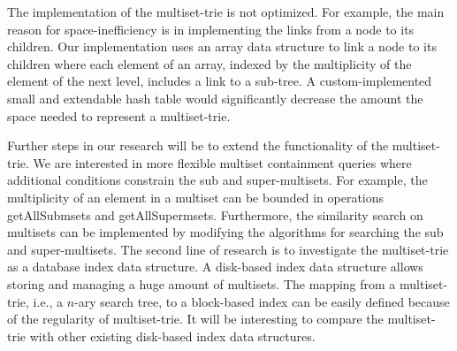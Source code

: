 The implementation of the multiset-trie is not optimized. For example, the main reason for space-inefficiency is in implementing the links from a node to its children. Our implementation uses an array data structure to link a node to its children where each element of an array, indexed by the multiplicity of the element of the next level, includes a link to a sub-tree. A custom-implemented small and extendable hash table would significantly decrease the amount the space needed to represent a multiset-trie.

%
Further steps in our research will be to extend the functionality of the multiset-trie. We are interested in more flexible multiset containment queries where additional conditions constrain the sub and super-multisets. For example, the multiplicity of an element in a multiset can be bounded in operations getAllSubmsets and getAllSupermsets. Furthermore, the similarity search on multisets can be implemented by modifying the algorithms for searching the sub and super-multisets. 
%
The second line of research is to investigate the multiset-trie as a database index data structure. A disk-based index data structure allows storing and managing a huge amount of multisets. The mapping from a multiset-trie, i.e., a $n$-ary search tree, to a block-based index can be easily defined because of the regularity of multiset-trie. It will be interesting to compare the multiset-trie with other existing disk-based index data structures.
